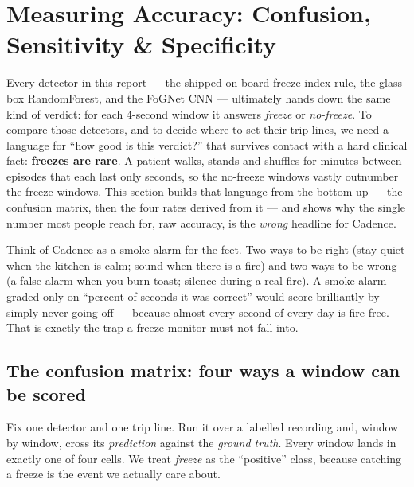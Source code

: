 \section{Measuring Accuracy: Confusion, Sensitivity \& Specificity}
\label{sec:metrics}

Every detector in this report --- the shipped on-board freeze-index rule, the
glass-box RandomForest, and the FoGNet CNN --- ultimately hands down the same kind of
verdict: for each 4-second window it answers \emph{freeze} or \emph{no-freeze}. To
compare those detectors, and to decide where to set their trip lines, we need a
language for ``how good is this verdict?'' that survives contact with a hard clinical
fact: \textbf{freezes are rare}. A patient walks, stands and shuffles for minutes
between episodes that each last only seconds, so the no-freeze windows vastly
outnumber the freeze windows. This section builds that language from the bottom up ---
the confusion matrix, then the four rates derived from it --- and shows why the
single number most people reach for, raw accuracy, is the \emph{wrong} headline for
Cadence.

\begin{intuition}
Think of Cadence as a smoke alarm for the feet. Two ways to be right (stay quiet when
the kitchen is calm; sound when there is a fire) and two ways to be wrong (a false
alarm when you burn toast; silence during a real fire). A smoke alarm graded only on
``percent of seconds it was correct'' would score brilliantly by simply never going
off --- because almost every second of every day is fire-free. That is exactly the
trap a freeze monitor must not fall into.
\end{intuition}

\subsection{The confusion matrix: four ways a window can be scored}

Fix one detector and one trip line. Run it over a labelled recording and, window by
window, cross its \emph{prediction} against the \emph{ground truth}. Every window
lands in exactly one of four cells. We treat \emph{freeze} as the ``positive'' class,
because catching a freeze is the event we actually care about.

